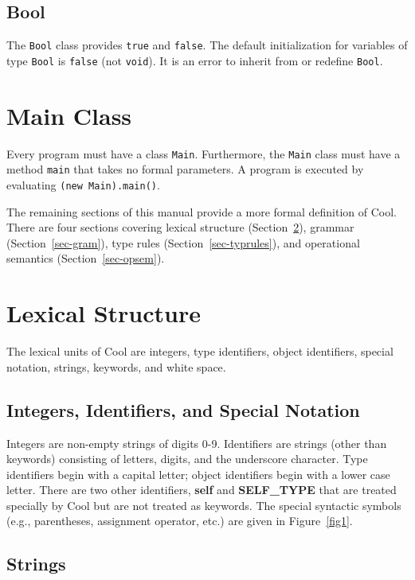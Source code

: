 \subsection{Bool}
\label{sec-bool}

The {\tt Bool} class provides {\tt true} and {\tt false}.  
The default initialization for variables of type {\tt Bool} is {\tt false}
(not {\tt void}).
It is an error to inherit from or redefine {\tt Bool}.

\section{Main Class}
\label{sec-main}

Every program must have a class {\tt Main}.
Furthermore, the {\tt Main} class must have a method {\tt main}
that takes no formal parameters.  A program is executed by
evaluating {\tt (new Main).main()}.

The remaining sections of this manual provide a more formal definition
of Cool.  There are four sections covering lexical structure (Section~\ref{lex-struct}), grammar (Section~\ref{sec-gram}), type rules (Section~\ref{sec-typrules}),
and operational semantics (Section~\ref{sec-opsem}).

\section{Lexical Structure}
\label{lex-struct}

The lexical units of Cool are integers, type
identifiers, object identifiers, special notation, strings, keywords,
and white space.

\subsection{Integers, Identifiers, and Special Notation}

Integers are non-empty strings of digits 0-9.  
Identifiers are strings (other than keywords) consisting of letters,
digits, and the underscore character.  Type identifiers begin with a
capital letter; object identifiers begin with a lower case letter.
There are two other identifiers,
{\bf self} and {\bf SELF\_TYPE} that are treated specially by Cool but are not
treated as keywords.  The special syntactic symbols (e.g., parentheses, assignment
operator, etc.) are given in Figure~\ref{fig1}.

\subsection{Strings}

